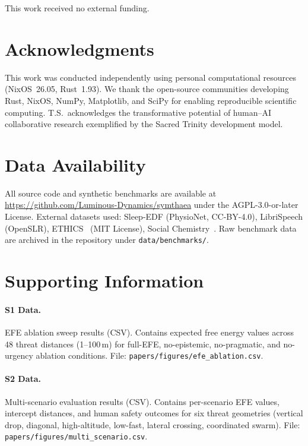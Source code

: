 \documentclass[10pt,letterpaper]{article}
\begin{document}
This work received no external funding.

\section*{Acknowledgments}

This work was conducted independently using personal computational resources
(NixOS~26.05, Rust~1.93). We thank the open-source communities developing
Rust, NixOS, NumPy, Matplotlib, and SciPy for enabling reproducible scientific
computing. T.S.\ acknowledges the transformative potential of human--AI
collaborative research exemplified by the Sacred Trinity development model.

\section*{Data Availability}

All source code and synthetic benchmarks are available at
\url{https://github.com/Luminous-Dynamics/symthaea} under the AGPL-3.0-or-later License.
External datasets used: Sleep-EDF (PhysioNet, CC-BY-4.0), LibriSpeech
(OpenSLR), ETHICS~\cite{hendrycks2021aligning} (MIT License), Social
Chemistry~\cite{forbes2020social}. Raw benchmark data are archived in the
repository under \texttt{data/benchmarks/}.

\section*{Supporting Information}

\paragraph*{S1 Data.}
\label{s1-data}
{EFE ablation sweep results (CSV). Contains expected free energy values across
48 threat distances (1--100\,m) for full-EFE, no-epistemic, no-pragmatic, and
no-urgency ablation conditions. File:
\texttt{papers/figures/efe\_ablation.csv}.}

\paragraph*{S2 Data.}
\label{s2-data}
{Multi-scenario evaluation results (CSV). Contains per-scenario EFE values,
intercept distances, and human safety outcomes for six threat geometries
(vertical drop, diagonal, high-altitude, low-fast, lateral crossing,
coordinated swarm). File: \texttt{papers/figures/multi\_scenario.csv}.}
\end{document}
